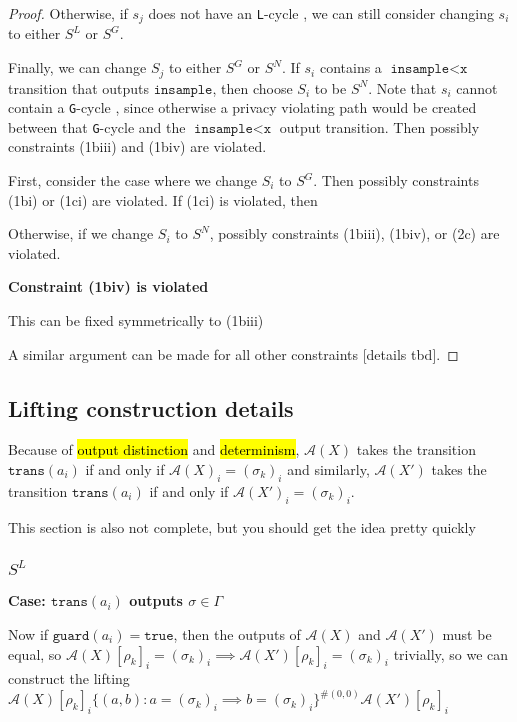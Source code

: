 \documentclass[12pt]{article}
\newcommand{\lguard}[1][x]{\texttt{insample} < \texttt{#1}}
\newcommand{\guard}{\texttt{guard}}
\newcommand{\trans}{\texttt{trans}}
\newcommand{\gcycle}{\texttt{G}-cycle }
\newcommand{\lcycle}{\texttt{L}-cycle }
\theoremstyle{definition}
\begin{document}
\begin{proof}
	Otherwise, if $s_j$ does not have an \lcycle, we can still consider changing $s_i$ to either $S^L$ or $S^G$. 
	
	Finally, we can change $S_j$ to either $S^G$ or $S^N$. If $s_i$ contains a $\lguard$ transition that outputs $\texttt{insample}$, then choose $S_i$ to be $S^N$. Note that $s_i$ cannot contain a \gcycle, since otherwise a privacy violating path would be created between that \gcycle and the $\lguard$ output transition. Then possibly constraints (1biii) and (1biv) are violated. 
	
	
	First, consider the case where we change $S_i$ to $S^G$. Then possibly constraints (1bi) or (1ci) are violated. If (1ci) is violated, then 
	
	Otherwise, if we change $S_i$ to $S^N$, possibly constraints (1biii), (1biv), or (2c) are violated. 
	

	\textbf{Constraint (1biv) is violated}

	This can be fixed symmetrically to (1biii)

	A similar argument can be made for all other constraints [details tbd].
\end{proof}

\subsection{Lifting construction details}\label{subsectionliftingdetails}

Because of \hl{output distinction} and \hl{determinism}, $\mathcal{A}(X)$ takes the transition $\trans(a_i)$ if and only if $\mathcal{A}(X)_i = (\sigma_k)_i$ and similarly, $\mathcal{A}(X')$ takes the transition $\trans(a_i)$ if and only if $\mathcal{A}(X')_i = (\sigma_k)_i$.

{\color{red} This section is also not complete, but you should get the idea pretty quickly}

\subsubsection{$S^L$}


\textbf{Case: $\trans(a_i)$ outputs $\sigma \in \Gamma$}

Now if $\guard(a_i) = \texttt{true}$, then the outputs of $\mathcal{A}(X)$ and $\mathcal{A}(X')$ must be equal, so $\mathcal{A}(X)[\rho_k]_i = (\sigma_k)_i \implies \mathcal{A}(X')[\rho_k]_i = (\sigma_k)_i$ trivially, so we can construct the lifting $\mathcal{A}(X)[\rho_k]_i\{(a, b): a = (\sigma_k)_i \implies b = (\sigma_k)_i\}^{\#(0, 0)}\mathcal{A}(X')[\rho_k]_i$
\end{document}
